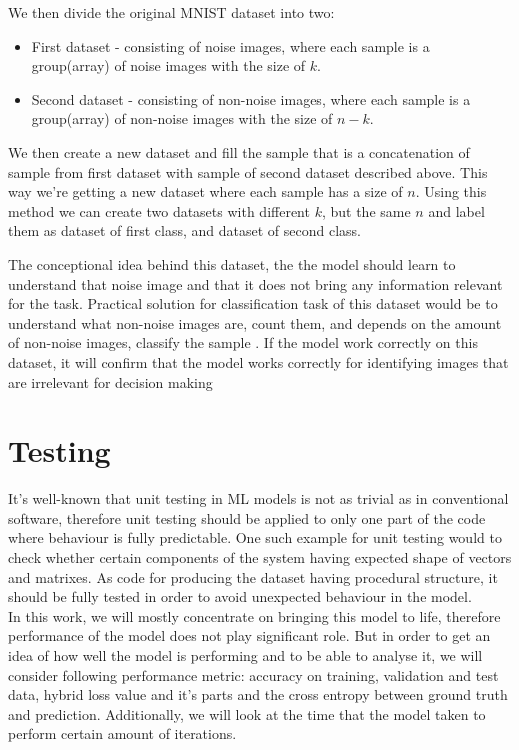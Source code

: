 
We then divide the original MNIST dataset into two:
\begin{itemize}
	\item First dataset - consisting of noise images, where each sample is a group(array)
		of noise images with the size of $k$.
	\item Second dataset - consisting of non-noise images, where each sample is a group(array)
		of non-noise images with the size of $n-k$.
\end{itemize}

We then create a new dataset and fill the sample that is a concatenation of sample
from first dataset with sample of second dataset described above.
This way we're getting a new dataset
where each sample has a size of $n$. Using this method we can create two datasets with
different $k$, but the same $n$ and label them as dataset of first class, and
dataset of second class.

The conceptional idea behind this dataset, the the model should learn to
understand that noise image and that it does not bring any information relevant for the task.
Practical solution for classification task of this dataset would be
to understand what non-noise images are,
count them, and depends on the amount of non-noise images,
classify the sample
. If the model work correctly on this dataset, it will confirm
 that the model works correctly
for identifying images that are irrelevant for decision making

\section{Testing}
It's well-known that unit testing in ML models is not as trivial
as in conventional software,
therefore unit testing should be applied to only one part of the code where
behaviour is fully predictable. One such example for unit testing would to
check whether
certain components of the system having expected shape of vectors and matrixes.
As code for producing the dataset having procedural structure,
it should be fully tested in order to avoid
unexpected behaviour in the model.
\\
In this work, we will mostly concentrate on bringing this model to life,
therefore performance of the model does not play significant role.
But in order to get an idea of how well the model is performing and
to be able to analyse it, we will consider following performance metric:
accuracy on training, validation and test data, hybrid loss value and it's parts
and the cross entropy between ground truth and prediction. Additionally,
we will look at the time that the model taken to perform certain
amount of iterations.

